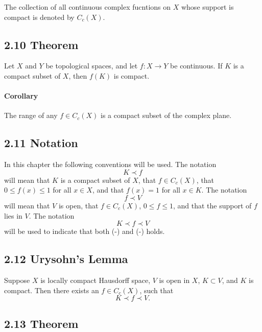 \documentclass[11pt,reqno]{amsart}
\renewcommand{\(}{\left(}
\renewcommand{\)}{\right)}
\renewcommand{\[}{\left[}
\renewcommand{\]}{\right]}
\begin{document}
The collection of all continuous complex fucntions on $X$ whose support is compact is denoted by $C_c(X)$.

\subsection{2.10 Theorem}

Let $X$ and $Y$ be topological spaces, and let $f : X \to Y$ be continuous. If $K$ is a compact subset of $X$, then $f (K)$ is compact.

\paragraph{Corollary}

The range of any $f \in C_c(X)$ is a compact subset of the complex plane.

\subsection{2.11 Notation}

In this chapter the following conventions will be used. The notation
\begin{equation}
  K \prec f
\end{equation}
will mean that $K$ is a compact subset of $X$, that $f \in C_c(X)$, that $0 \le f(x) \le 1$ for all $x \in X$, and that $f(x) = 1$ for all $x \in K$.
The notation 
\begin{equation}
  f \prec V
\end{equation}
will mean that $V$ is open, that $f \in C_c(X)$, $0 \le f \le 1$, and that the support of $f$ lies in $V$. The notation
\begin{equation}
  K \prec f \prec V
\end{equation}
will be used to indicate that both (-) and (-) holds.

\subsection{2.12 Urysohn's Lemma}

Suppose $X$ is locally compact Hausdorff space, $V$ is open in $X$, $K \subset V$, and $K$ is compact. Then there exists an $f \in C_c(X)$, such that 
\begin{equation}
  K \prec f \prec V.
\end{equation}

\subsection{2.13 Theorem}
\end{document}
